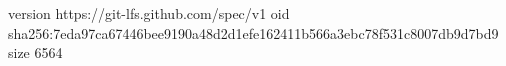 version https://git-lfs.github.com/spec/v1
oid sha256:7eda97ca67446bee9190a48d2d1efe162411b566a3ebc78f531c8007db9d7bd9
size 6564
